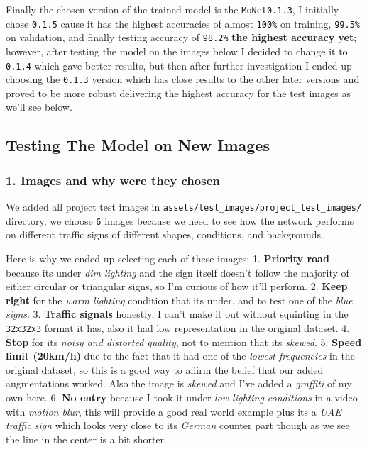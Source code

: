 \documentclass[11pt]{article}
\begin{document}
Finally the chosen version of the trained model is the
\texttt{MoNet0.1.3}, I initially chose \texttt{0.1.5} cause it has the
highest accuracies of almost \texttt{100\%} on training, \texttt{99.5\%}
on validation, and finally testing accuracy of \texttt{98.2\%}
\textbf{the highest accuracy yet}; however, after testing the model on
the images below I decided to change it to \texttt{0.1.4} which gave
better results, but then after further investigation I ended up choosing
the \texttt{0.1.3} version which has close results to the other later
versions and proved to be more robust delivering the highest accuracy
for the test images as we'll see below.

    \hypertarget{testing-the-model-on-new-images}{%
\subsection{Testing The Model on New
Images}\label{testing-the-model-on-new-images}}

\hypertarget{images-and-why-were-they-chosen}{%
\subsubsection{1. Images and why were they
chosen}\label{images-and-why-were-they-chosen}}

We added all project test images in
\texttt{assets/test\_images/project\_test\_images/} directory, we choose
\texttt{6} images because we need to see how the network performs on
different traffic signs of different shapes, conditions, and
backgrounds.

Here is why we ended up selecting each of these images: 1.
\textbf{Priority road} because its under \emph{dim lighting} and the
sign itself doesn't follow the majority of either circular or triangular
signs, so I'm curious of how it'll perform. 2. \textbf{Keep right} for
the \emph{warm lighting} condition that its under, and to test one of
the \emph{blue signs}. 3. \textbf{Traffic signals} honestly, I can't
make it out without squinting in the \texttt{32x32x3} format it has,
also it had low representation in the original dataset. 4. \textbf{Stop}
for its \emph{noisy and distorted quality}, not to mention that its
\emph{skewed}. 5. \textbf{Speed limit (20km/h)} due to the fact that it
had one of the \emph{lowest frequencies} in the original dataset, so
this is a good way to affirm the belief that our added augmentations
worked. Also the image is \emph{skewed} and I've added a \emph{graffiti}
of my own here. 6. \textbf{No entry} because I took it under \emph{low
lighting conditions} in a video with \emph{motion blur}, this will
provide a good real world example plus its a \emph{UAE traffic sign}
which looks very close to its \emph{German} counter part though as we
see the line in the center is a bit shorter.
\end{document}
